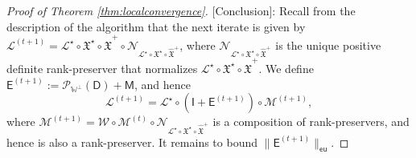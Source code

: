 \documentclass[11pt,letterpaper]{article}
\newcommand{\botimes}{\boldsymbol \otimes}
\newcommand{\ct}{\mathcal{T}}
\newcommand{\cp}{\mathcal{P}}
\newcommand{\xx}{\mathfrak{X}}
\newcommand{\sfe}{\mathsf{E}}
\newcommand{\sfd}{\mathsf{D}}
\newcommand{\sfi}{\mathsf{I}}
\newcommand{\sfm}{\mathsf{M}}
\newcommand{\eu}{\mathsf{eu}}
\begin{document}
\begin{proof}[Proof of Theorem \ref{thm:localconvergence}]
	[Conclusion]: Recall from the description of the algorithm that the next iterate is given by $\mathcal{L}^{(t+1)} = \mathcal{L}^{\star} \circ \xx^{\star} \circ \hat{\xx}^{+} \circ \mathcal{N}_{\mathcal{L}^{\star} \circ \xx^{\star} \circ \hat{\xx}^{+}}$, where $\mathcal{N}_{\mathcal{L}^{\star} \circ \xx^{\star} \circ \hat{\xx}^{+}}$ is the unique positive definite rank-preserver that normalizes $\mathcal{L}^{\star} \circ \xx^{\star} \circ \hat{\xx}^{+}$.  We define $\sfe^{(t+1)} := \cp_{\mathbb{W}^{\perp}} (\sfd) + \sfm$, and hence
	\begin{equation} \label{eq:nextdictestimate}
	\mathcal{L}^{(t+1)} = \mathcal{L}^{\star} \circ (\sfi + \sfe^{(t+1)}) \circ \mathcal{M}^{(t+1)},
	\end{equation}
	where $\mathcal{M}^{(t+1)} = \mathcal{W} \circ \mathcal{M}^{(t)} \circ \mathcal{N}_{\mathcal{L}^{\star} \circ \xx^{\star} \circ \hat{\xx}^{+}}$ is a composition of rank-preservers, and hence is also a rank-preserver.  It remains to bound $\|\sfe^{(t+1)}\|_{\eu}$.%
	


\end{proof}
\end{document}
